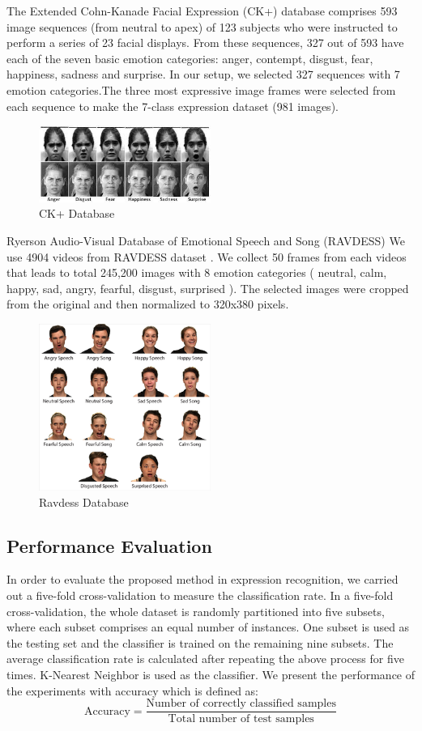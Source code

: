 \documentclass[12pt]{article}
\begin{document}
The Extended Cohn-Kanade Facial Expression (CK+) database \cite{lucey2010extended} comprises 593 image sequences (from neutral	to apex) of 123 subjects who were instructed to perform a series of 23 facial displays. From these sequences, 327 out of 593 have each of the seven basic emotion categories: anger, contempt, disgust, fear, happiness, sadness and surprise. In our setup, we selected 327 sequences with 7 emotion categories.The three most expressive image frames were selected from each sequence to make the 7-class expression dataset (981 images).
\begin{figure}[h]
	\centering
	\includegraphics[width=0.5\textwidth]{images_ck+}
	\caption{CK+ Database}		
\end{figure}

Ryerson Audio-Visual Database of Emotional Speech and Song (RAVDESS) We use 4904 videos from RAVDESS dataset \cite{livingstone2018ryerson}. We collect 50 frames from each videos that leads to total 245,200 images with 8 emotion categories ( neutral, calm, happy, sad, angry, fearful, disgust, surprised ). The selected images were cropped from the original and then normalized to 320x380 pixels.
\begin{figure}[h]	
	\centering
	\includegraphics[width=0.5\textwidth]{images_ravdess}
	\caption{Ravdess Database}		
\end{figure}

\subsection{Performance Evaluation}
In order to evaluate the proposed method in expression recognition, we carried out
a five-fold cross-validation to measure the classification rate. In a five-fold cross-validation, the whole dataset is randomly partitioned into five subsets, where
each subset comprises an equal number of instances. One subset is used as the testing set and the classifier is trained on the remaining nine subsets. The average classification rate is calculated after repeating the above process for five times. K-Nearest Neighbor is used as the classifier. We present the performance of the experiments with accuracy which is defined as:
$$\text{Accuracy}=\frac{\text{Number of correctly classified samples}}{\text{Total number of test samples}}$$
\end{document}
